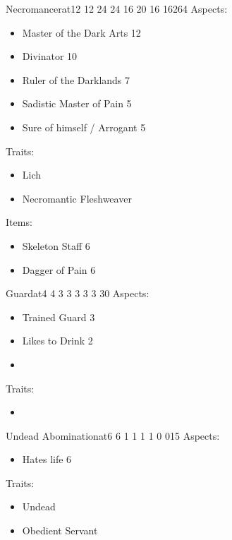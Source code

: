 \documentclass[11pt]{article}
\begin{document}
{\begin{npc}{Necromancer}{at}{12 12 24 24 16 20 16 16}{264}
Aspects:
\begin{itemize}
\item Master of the Dark Arts 12
\item Divinator 10
\item Ruler of the Darklands 7
\item Sadistic Master of Pain 5
\item Sure of himself / Arrogant 5
\end{itemize}

\columnbreak

Traits:
\begin{itemize}
\item Lich
\item Necromantic Fleshweaver
\end{itemize}

Items:
\begin{itemize}
\item Skeleton Staff 6
\item Dagger of Pain 6
\end{itemize}
\end{npc}

\begin{npc}{Guard}{at}{4 4 3 3 3 3 3 3}{0}
Aspects:
\begin{itemize}
\item Trained Guard 3
\item Likes to Drink 2
\item 
\end{itemize}

\columnbreak

Traits:
\begin{itemize}
\item 
\end{itemize}
\end{npc}

\begin{npc}{Undead Abomination}{at}{6 6 1 1 1 1 0 0}{15}
Aspects:
\begin{itemize}
\item Hates life 6
\end{itemize}

\columnbreak

Traits:
\begin{itemize}
\item Undead
\item Obedient Servant
\end{itemize}
\end{npc}
}
\end{document}
